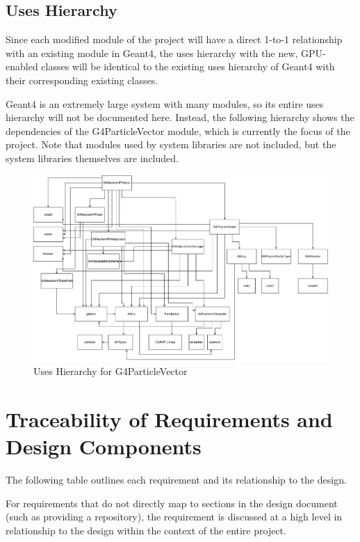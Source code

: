 \documentclass[12pt]{article}
\newcommand{\todo}[1]{\textcolor{red}{[TODO: #1]}} \else
\newcommand{\authornote}[3]{} \newcommand{\todo}[1]{} \fi
\newcommand{\ds}[1]{\authornote{blue}{DS}{#1}}
\newcommand{\mmp}[1]{\authornote{green}{MP}{#1}}
\begin{document}
\subsection{Uses Hierarchy}
Since each modified module of the project will have a direct 1-to-1 relationship with an existing module in Geant4, the uses hierarchy with the new, GPU-enabled classes will be identical to the existing uses hierarchy of Geant4 with their corresponding existing classes.

Geant4 is an extremely large system with many modules, so its entire uses hierarchy will not be documented here. Instead, the following hierarchy shows the dependencies of the G4ParticleVector module, which is currently the focus of the project. Note that modules used by system libraries are not included, but the system libraries themselves are included.

\begin{figure}[h]
\caption{Uses Hierarchy for G4ParticleVector}\label{imgUsesHierarchy}
\includegraphics[width=\textwidth]{uses_hierarchy.pdf}
\end{figure}
\FloatBarrier

\ds{Hard to read.} \mmp{sorry}

\section{Traceability of Requirements and Design Components}%
The following table outlines each requirement and its relationship to the design.

For requirements that do not directly map to sections in the design document (such as providing a repository), the requirement is discussed at a high level in relationship to the design within the context of the entire project.
\end{document}
